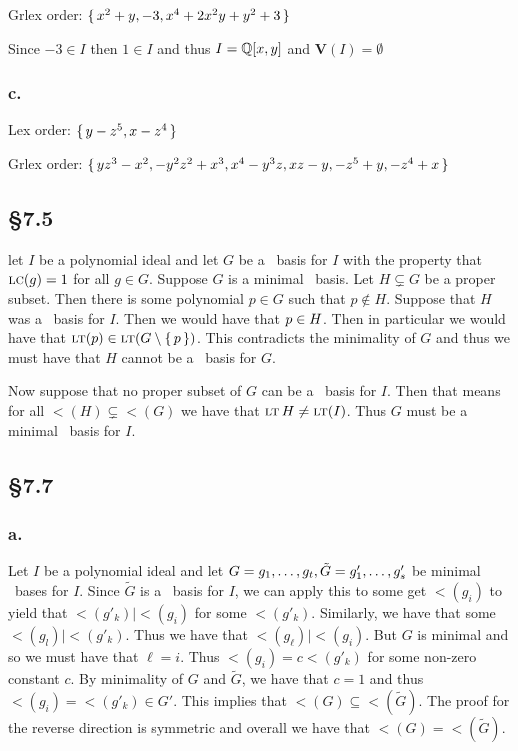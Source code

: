 \documentclass[letterpaper]{article}
\begin{document}
Grlex order: $\set{x^{2} + y, -3, x^{4} + 2 x^{2} y + y^{2} + 3}$

Since $-3 \in I$ then $1 \in I$ and thus $I = \Q\bqty{x, y}$ and $\textbf{V}(I) = \emptyset$

\subsubsection*{c.}

Lex order: $\set{y - z^{5}, x - z^{4}}$

Grlex order: $\set{y z^{3} - x^{2}, -y^{2} z^{2} + x^{3}, x^{4} - y^{3} z, x z - y, -z^{5} + y, -z^{4} + x}$

\subsection*{\S 7.5}

let $I$ be a polynomial ideal and let $G$ be a \Grobner\ basis for $I$ with the property that $\operatorname{\textsc{lc}}(g) = 1$ for all $g \in G$.
Suppose $G$ is a minimal \Grobner\ basis.
Let $H \subsetneq G$ be a proper subset.
Then there is some polynomial $p \in G$ such that $p \notin H$.
Suppose that $H$ was a \Grobner\ basis for $I$.
Then we would have that $p \in \gen{H}$.
Then in particular we would have that $\lt(p) \in \gen{\lt(G \setminus \set{p})}$.
This contradicts the minimality of $G$ and thus we must have that $H$ cannot be a \Grobner\ basis for $G$.

Now suppose that no proper subset of $G$ can be a \Grobner\ basis for $I$.
Then that means for all $\lt(H) \subsetneq \lt(G)$ we have that $\gen{\lt{H}} \neq \gen{\lt(I)}$.
Thus $G$ must be a minimal \Grobner\ basis for $I$.

\subsection*{\S 7.7}

\subsubsection*{a.}

Let $I$ be a polynomial ideal and let $G = \gen{g_{1}, \ldots, g_{t}}, \tilde{G} = \gen{g'_{1}, \ldots, g'_{s}}$ be minimal \Grobner\ bases for $I$.
Since $\tilde{G}$ is a \Grobner\ basis for $I$, we can apply this to some get $\lt(g_{i})$ to yield that $\lt(g'_{k}) \mid \lt(g_{i})$ for some $\lt(g'_{k})$.
Similarly, we have that some $\lt(g_{l}) \mid \lt(g'_{k})$.
Thus we have that $\lt(g_{\ell}) \mid \lt(g_{i})$.
But $G$ is minimal and so we must have that $\ell = i$.
Thus $\lt(g_{i}) = c \lt(g'_{k})$ for some non-zero constant $c$.
By minimality of $G$ and $\tilde{G}$, we have that $c = 1$ and thus $\lt(g_{i}) = \lt(g'_{k}) \in G'$.
This implies that $\lt(G) \subseteq \lt(\tilde{G})$.
The proof for the reverse direction is symmetric and overall we have that $\lt(G) = \lt(\tilde{G})$.
\end{document}
